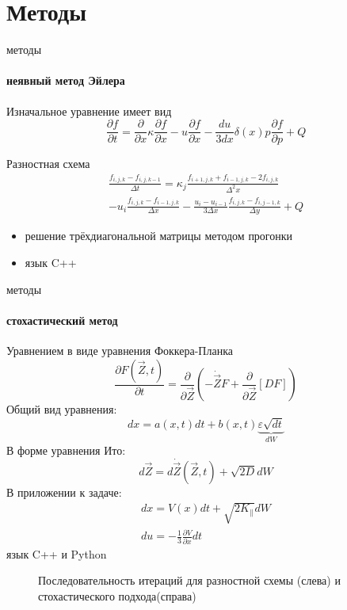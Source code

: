 \documentclass[8pt,pdf,hyperref={unicode},serif]{beamer}
\begin{document}
\section{Методы}
\begin{frame}{методы}
\framesubtitle{неявный метод Эйлера}
Изначальное уравнение имеет вид
\begin{equation}
\frac{\partial f}{\partial t} = \frac{\partial}{\partial x} \kappa \frac{\partial f}{\partial x} - u \frac{\partial f}{\partial x} - \frac{du}{3dx} \delta(x) p \frac{\partial f}{\partial p} +Q
\end{equation}

\pause
Разностная схема
\begin{multline}
\frac{f_{i,j,k} - f_{i,j,k-1}}{\Delta t} = \kappa_{j} \frac{f_{i+1,j,k}+f_{i-1,j,k}-2f_{i,j,k}}{\Delta^2 x} \\
- u_i\frac{f_{i,j,k}-f_{i-1,j,k}}{\Delta x}-\frac{u_i-u_{i-1}}{3\Delta x}\frac{f_{i,j,k}-f_{i,j-1,k}}{\Delta y} + Q
\end{multline}
\pause
\begin{itemize}
\item решение трёхдиагональной матрицы методом прогонки
\item язык C++
\end{itemize}
\end{frame}

\begin{frame}{методы}
\framesubtitle{стохастический метод}
Уравнением в виде уравнения Фоккера-Планка
\begin{equation}
\frac{\partial F(\vec{Z}, t)}{\partial t} = \frac{\partial}{\partial \vec{Z}}\left( -\dot{\vec{Z}}F+\frac{\partial}{\partial\vec{Z}}[DF]  \right)
\end{equation}
\pause
Общий вид уравнения:
\begin{equation}
dx = a(x, t)dt + b(x,t) \underbrace{\varepsilon \sqrt{dt}}_{dW}
\end{equation}
\pause
В форме уравнения Ито:
\begin{equation}
d\vec{Z} = d\dot{\vec{Z}}(\vec{Z}, t)+\sqrt{2D}dW
\end{equation}
В приложении к задаче:
\begin{eqnarray}
dx = V(x)dt+\sqrt{2K_{\parallel}}dW\\
du = - \frac{1}{3} \frac{\partial V}{\partial x} dt
\end{eqnarray}
\pause
 язык C++ и Python
\end{frame}

\begin{frame}
\begin{figure}[H]
  \centering
  
  \caption{Последовательность итераций для разностной схемы (слева) и стохастического подхода(справа)}
\end{figure}
\end{frame}
\end{document}

